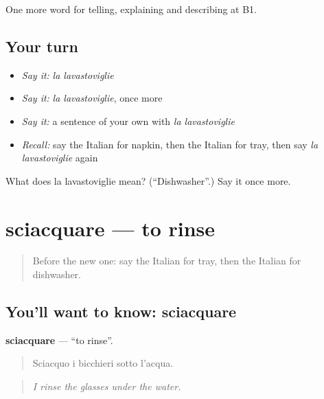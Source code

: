 \begin{grammarlens}[title={What you've built}]
One more word for telling, explaining and describing at B1.
\end{grammarlens}

\subsection*{Your turn}
\begin{itemize}
\raggedright
  \item \emph{Say it:} \emph{la lavastoviglie}
  \item \emph{Say it:} \emph{la lavastoviglie}, once more
  \item \emph{Say it:} a sentence of your own with \emph{la lavastoviglie}
  \item \emph{Recall:} say the Italian for napkin, then the Italian for tray, then say \emph{la lavastoviglie} again
\end{itemize}

\begin{tcolorbox}[breakable,colback=teal!4,colframe=teal!35!black,title={Before you move on}]
What does la lavastoviglie mean? (\textquotedblleft{}Dishwasher\textquotedblright{}.) Say it once more.
\end{tcolorbox}
\section[sciacquare]{sciacquare — to rinse}

\label{lesson:IT-C534-sciacquare}



\begin{quote}
Before the new one: say the Italian for tray, then the Italian for dishwasher.
\end{quote}

\subsection*{You'll want to know: sciacquare}
\textbf{sciacquare} — \textquotedblleft{}to rinse\textquotedblright{}.

\begin{quote}
Sciacquo i bicchieri sotto l'acqua.
\end{quote}

\begin{quote}
\emph{I rinse the glasses under the water.}
\end{quote}

